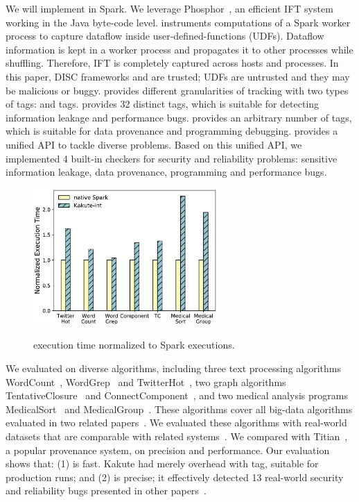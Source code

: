 We will implement \kakute in Spark.
We leverage Phosphor~\cite{oo14:phosphor}, an efficient IFT system working
in the Java byte-code level.
\kakute instruments computations of a Spark worker process
to capture dataflow inside user-defined-functions (UDFs).
Dataflow information
is kept in a worker process and \kakute propagates it to other processes while 
shuffling.
Therefore, IFT is completely captured across hosts and processes.
In this paper, DISC frameworks and \kakute are trusted; UDFs are untrusted and 
they
may be malicious or buggy.
\kakute provides different granularities of tracking with two types of tags: 
and  tags.  provides 32 distinct tags,
which is suitable for detecting information
leakage and performance bugs. 
provides an
arbitrary number of tags, which is suitable for
data provenance and programming debugging.
\kakute provides a unified API to tackle diverse problems. Based on this 
unified API, we implemented 4 built-in checkers for \appsn
security and reliability problems: sensitive information leakage, data 
provenance, programming and performance bugs.

\begin{figure}
  \vspace{-.1in}
  \includegraphics[width=7cm]{figures/time_overhead.ps}\\
  \vspace{-.3in}
  \caption{\kakute execution time normalized to Spark executions.}
  \label{fig:scalability}
\end{figure}

 We evaluated \kakute on \appeval diverse 
algorithms, including three text processing
algorithms WordCount~\cite{spark:example}, WordGrep~\cite{newt:socc13} and 
TwitterHot~\cite{spark:example}, two graph algorithms 
TentativeClosure~\cite{spark:example}
and ConnectComponent~\cite{spark:example}, and two medical analysis programs 
MedicalSort~\cite{pigmix} and MedicalGroup~\cite{pigmix}.
These algorithms cover
all big-data algorithms evaluated in two related 
papers~\cite{vldb15:titian,icse16:bigdebug}.
We evaluated these algorithms with real-world datasets that are comparable with
related systems~\cite{vldb16:output, icse16:bigdebug, vldb15:titian}.
We compared \kakute with Titian~\cite{vldb15:titian}, a popular provenance 
system, on precision and performance.
Our evaluation shows that: (1) \kakute is fast. Kakute had merely \timeavg 
overhead with 
  tag, suitable for production runs; and (2) \kakute is precise;
 it effectively detected 13 real-world security and reliability
  bugs presented in other 
papers~\cite{arthur:dave2013,icse16:bigdebug,airavat:nsdi10}.

